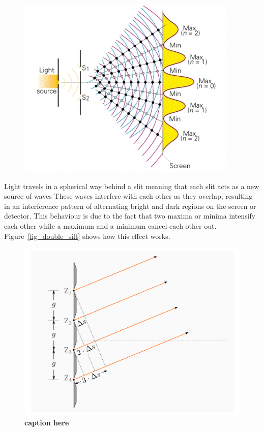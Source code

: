    

    \begin{figure}[H]
        \centering
        \includegraphics[]{src/images/interference_double_slit.jpg}
        \caption{}
        \label{fig_double_slit}
    \end{figure}

    Light travels in a spherical way behind a slit meaning that each slit acts as a new source of waves
    These waves interfere with each other as they overlap, resulting in an interference pattern of alternating bright and dark regions on the screen or detector.
    This behaviour is due to the fact that two maxima or minima intensify each other while a maximum and a minimum cancel each other out.
    Figure~\ref{fig_double_silt} shows how this effect works.

    \begin{figure}[H]
        \centering
        \includegraphics[]{src/images/interference_grating.png}
        \caption{\textbf{caption here}}
        \label{fig_grating}
    \end{figure}


